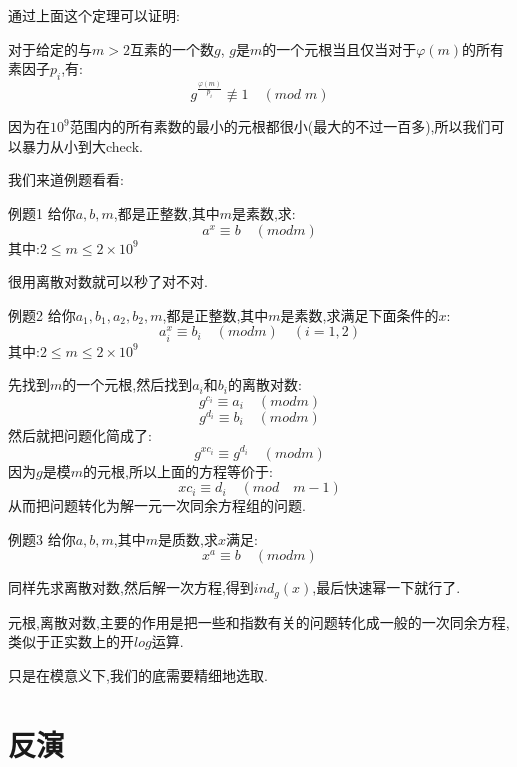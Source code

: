 \documentclass{beamer}
\begin{document}
		\begin{frame}
			通过上面这个定理可以证明:
			\begin{theorem}
				对于给定的与$m > 2$互素的一个数$g$, $g$是$m$的一个元根当且仅当对于$\varphi(m)$的所有素因子$p_i$,有:
				$$
				g^{\frac{\varphi(m)}{p_i}} \not \equiv 1 \quad (mod \; m)
				$$
			\end{theorem}
			因为在$10^9$范围内的所有素数的最小的元根都很小(最大的不过一百多),所以我们可以暴力从小到大check.
		\end{frame}
		
		\begin{frame}
			我们来道例题看看:
			\begin{block}{例题1}
				给你$a,b,m$,都是正整数,其中$m$是素数,求:
				$$
					a^x \equiv b \quad (mod m)
				$$
				其中:$2 \leq m \leq 2\times10^9$
			\end{block}
			很用离散对数就可以秒了对不对.
		\end{frame}
		\begin{frame}
			\begin{block}{例题2}
				给你$a_1,b_1,a_2,b_2,m$,都是正整数,其中$m$是素数,求满足下面条件的$x$:
				$$
					a_i^x \equiv b_i \quad (mod m) \quad(i = 1, 2)
				$$
				其中:$2 \leq m \leq 2\times10^9$
			\end{block}

		\end{frame}
		\begin{frame}
				先找到$m$的一个元根,然后找到$a_i$和$b_i$的离散对数:
				$$
				g^{c_i} \equiv a_i \quad (mod m)
				$$
				$$
				g^{d_i} \equiv b_i \quad( mod m)
				$$
				然后就把问题化简成了:
				$$
				g^{xc_i} \equiv g^{d_i} \quad( mod m)
				$$
				因为$g$是模$m$的元根,所以上面的方程等价于:
				$$
					xc_i \equiv d_i \quad(mod \quad m - 1)
				$$
				从而把问题转化为解一元一次同余方程组的问题.
		\end{frame}
		\begin{frame}
			\begin{block}{例题3}
				给你$a,b,m$,其中$m$是质数,求$x$满足:
				$$
					x^a \equiv b \quad (mod m)
				$$
			\end{block}
			同样先求离散对数,然后解一次方程,得到$ind_g(x)$,最后快速幂一下就行了.
		\end{frame}
		\begin{frame}
			元根,离散对数,主要的作用是把一些和指数有关的问题转化成一般的一次同余方程,类似于正实数上的开$log$运算.
			
			只是在模意义下,我们的底需要精细地选取.
		\end{frame}
		\section{反演}
		
				
\end{document}
